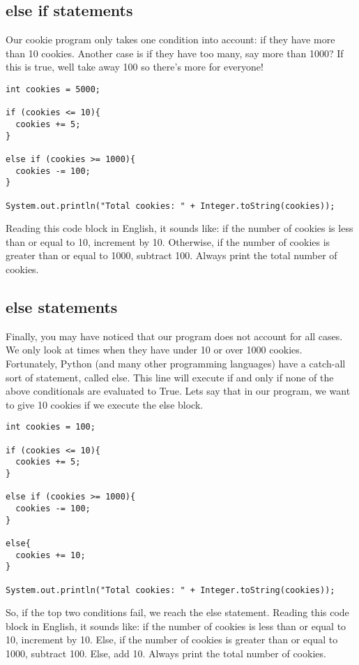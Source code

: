 \documentclass[14pt]{extreport}%
\begin{document}
\subsection*{else if statements}
Our cookie program only takes one condition into account: if they have more
than 10 cookies. Another case is if they have too many, say more than 1000?
If this is true, well take away 100 so there's more for everyone!

\begin{lstlisting}
int cookies = 5000;

if (cookies <= 10){
  cookies += 5;
}

else if (cookies >= 1000){
  cookies -= 100;
}

System.out.println("Total cookies: " + Integer.toString(cookies));
\end{lstlisting}{}
Reading this code
block in English, it sounds like: if the number of cookies is less than or equal
to 10, increment by 10. Otherwise, if the number of cookies is greater than or equal
to 1000, subtract 100. Always print the total number of cookies.

\subsection*{else statements}
Finally, you may have noticed that our program does not account for all cases. We only look at times when they have under 10 or over 1000 cookies. Fortunately, Python (and many other programming languages) have a catch-all sort of statement, called else. This line will execute if and only if none of the above conditionals are evaluated to True. Lets say that in our program, we want to give 10 cookies if we execute the else block.

\begin{lstlisting}
int cookies = 100;

if (cookies <= 10){
  cookies += 5;
}

else if (cookies >= 1000){
  cookies -= 100;
}

else{
  cookies += 10;
}

System.out.println("Total cookies: " + Integer.toString(cookies));
\end{lstlisting}{}

So, if the top two conditions fail, we reach the else statement. Reading this code block in English, it sounds like: if the number of cookies is less than or equal to 10, increment by 10. Else, if the number of cookies is greater than or equal to 1000, subtract 100. Else, add 10. Always print the total number of cookies.
\end{document}
